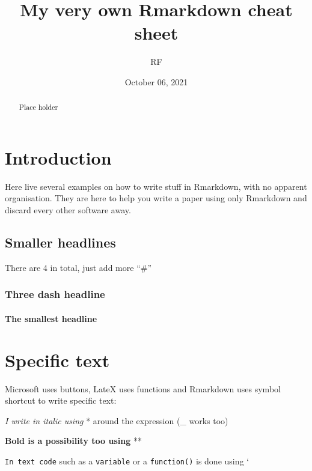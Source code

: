 \documentclass[
  11pt,
]{article}
\title{\textbf{My very own Rmarkdown cheat sheet}}
\author{RF}
\date{October 06, 2021}
\begin{document}
\maketitle
\begin{abstract}
Place holder
\end{abstract}

{
\setcounter{tocdepth}{2}
\tableofcontents
}
\hypertarget{introduction}{%
\section{Introduction}\label{introduction}}

Here live several examples on how to write stuff in Rmarkdown, with no apparent organisation. They are here to help you write a paper using only Rmarkdown and discard every other software away.

\hypertarget{smaller-headlines}{%
\subsection{Smaller headlines}\label{smaller-headlines}}

There are 4 in total, just add more ``\#''

\hypertarget{three-dash-headline}{%
\subsubsection{Three dash headline}\label{three-dash-headline}}

\hypertarget{the-smallest-headline}{%
\paragraph{The smallest headline}\label{the-smallest-headline}}

\hypertarget{specific-text}{%
\section{Specific text}\label{specific-text}}

Microsoft uses buttons, LateX uses functions and Rmarkdown uses symbol shortcut to write specific text:

\emph{I write in italic using} * around the expression (\_ works too)

\textbf{Bold is a possibility too using} **

\texttt{In\ text\ code} such as a \texttt{variable} or a \texttt{function()} is done using `
\end{document}
